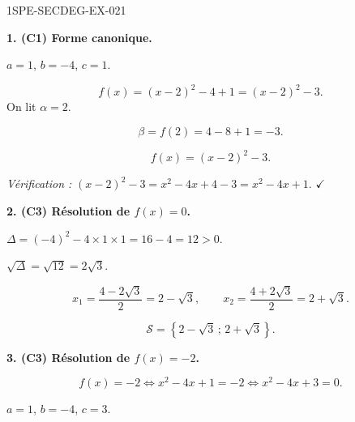 \begin{corrige}{1SPE-SECDEG-EX-021}


\medskip
\textbf{1. (C1) Forme canonique.}


$a = 1$, $b = -4$, $c = 1$.

\[f(x)=(x-2)^2-4+1=(x-2)^2-3.\]
On lit $\alpha=2$.

\[\beta = f(2) = 4 - 8 + 1 = -3.\]

\[\boxed{f(x) = (x - 2)^2 - 3.}\]

\textit{Vérification :} $(x-2)^2 - 3 = x^2 - 4x + 4 - 3 = x^2 - 4x + 1$. \hfill $\checkmark$

\medskip
\textbf{2. (C3) Résolution de $f(x) = 0$.}


$\Delta = (-4)^2 - 4 \times 1 \times 1 = 16 - 4 = 12 > 0$.

$\sqrt{\Delta} = \sqrt{12} = 2\sqrt{3}$.

\[x_1 = \frac{4 - 2\sqrt{3}}{2} = 2 - \sqrt{3}, \qquad x_2 = \frac{4 + 2\sqrt{3}}{2} = 2 + \sqrt{3}.\]

\[\boxed{\mathcal{S} = \left\{2 - \sqrt{3}\,;\,2 + \sqrt{3}\right\}.}\]

\medskip
\textbf{3. (C3) Résolution de $f(x) = -2$.}


\[f(x) = -2 \iff x^2 - 4x + 1 = -2 \iff x^2 - 4x + 3 = 0.\]

$a = 1$, $b = -4$, $c = 3$.


\end{corrige}

